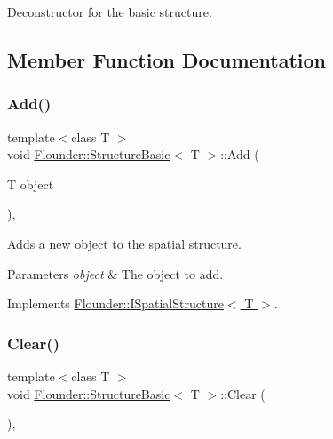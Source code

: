 Deconstructor for the basic structure. 



\subsection{Member Function Documentation}
\mbox{\label{class_flounder_1_1_structure_basic_a9af4ffc54290689b65b22261118591fe}} 
\subsubsection{\texorpdfstring{Add()}{Add()}}
{\footnotesize\ttfamily template$<$class T $>$ \\
void \hyperlink{class_flounder_1_1_structure_basic}{Flounder\+::\+Structure\+Basic}$<$ T $>$\+::Add (\begin{DoxyParamCaption}\item[{T}]{object }\end{DoxyParamCaption})\hspace{0.3cm}{\ttfamily [override]}, {\ttfamily [virtual]}}



Adds a new object to the spatial structure. 


\begin{DoxyParams}{Parameters}
{\em object} & The object to add. \\
\hline
\end{DoxyParams}


Implements \hyperlink{class_flounder_1_1_i_spatial_structure_a5e3e1c164fb928c74a266f6d0de6cc50}{Flounder\+::\+I\+Spatial\+Structure$<$ T $>$}.

\mbox{\label{class_flounder_1_1_structure_basic_ae5ca6b77a74f2277ea27d1d6b9e4ad64}} 
\subsubsection{\texorpdfstring{Clear()}{Clear()}}
{\footnotesize\ttfamily template$<$class T $>$ \\
void \hyperlink{class_flounder_1_1_structure_basic}{Flounder\+::\+Structure\+Basic}$<$ T $>$\+::Clear (\begin{DoxyParamCaption}{ }\end{DoxyParamCaption})\hspace{0.3cm}{\ttfamily [override]}, {\ttfamily [virtual]}}



